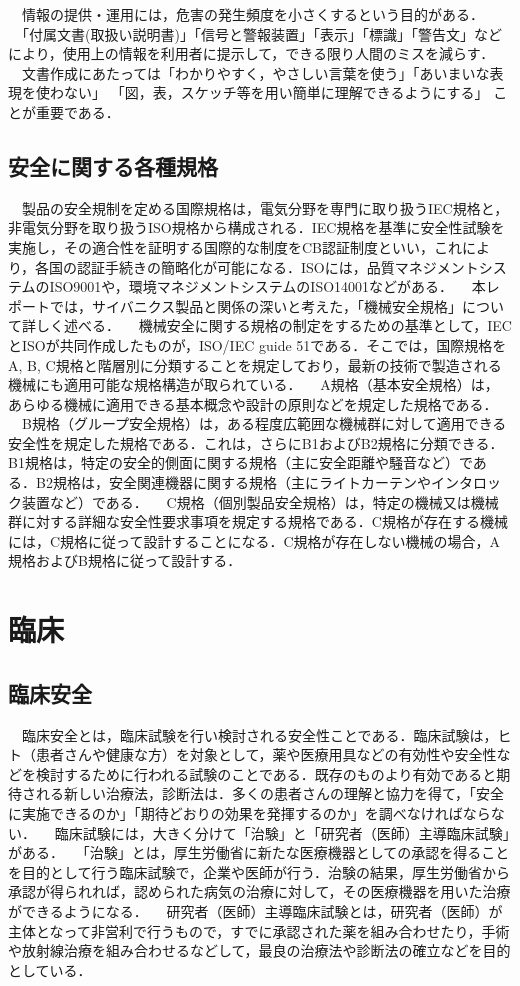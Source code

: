 \documentclass[uplatex,a4paper]{jsarticle}
\begin{document}
　情報の提供・運用には，危害の発生頻度を小さくするという目的がある．
　「付属文書(取扱い説明書)」「信号と警報装置」「表示」「標識」「警告文」などにより，使用上の情報を利用者に提示して，できる限り人間のミスを減らす．
　文書作成にあたっては「わかりやすく，やさしい言葉を使う」「あいまいな表現を使わない」 「図，表，スケッチ等を用い簡単に理解できるようにする」 ことが重要である．
　

\subsection{安全に関する各種規格}
　製品の安全規制を定める国際規格は，電気分野を専門に取り扱うIEC規格と，非電気分野を取り扱うISO規格から構成される．IEC規格を基準に安全性試験を実施し，その適合性を証明する国際的な制度をCB認証制度といい，これにより，各国の認証手続きの簡略化が可能になる．ISOには，品質マネジメントシステムのISO9001や，環境マネジメントシステムのISO14001などがある．
　本レポートでは，サイバニクス製品と関係の深いと考えた，「機械安全規格」について詳しく述べる．
　機械安全に関する規格の制定をするための基準として，IECとISOが共同作成したものが，ISO/IEC guide 51である．そこでは，国際規格をA, B, C規格と階層別に分類することを規定しており，最新の技術で製造される機械にも適用可能な規格構造が取られている．
　A規格（基本安全規格）は，あらゆる機械に適用できる基本概念や設計の原則などを規定した規格である．
　B規格（グループ安全規格）は，ある程度広範囲な機械群に対して適用できる安全性を規定した規格である．これは，さらにB1およびB2規格に分類できる．B1規格は，特定の安全的側面に関する規格（主に安全距離や騒音など）である．B2規格は，安全関連機器に関する規格（主にライトカーテンやインタロック装置など）である．
　C規格（個別製品安全規格）は，特定の機械又は機械群に対する詳細な安全性要求事項を規定する規格である．C規格が存在する機械には，C規格に従って設計することになる．C規格が存在しない機械の場合，A規格およびB規格に従って設計する．


\section{臨床}
\subsection{臨床安全}
　臨床安全とは，臨床試験を行い検討される安全性ことである．臨床試験は，ヒト（患者さんや健康な方）を対象として，薬や医療用具などの有効性や安全性などを検討するために行われる試験のことである．既存のものより有効であると期待される新しい治療法，診断法は．多くの患者さんの理解と協力を得て，「安全に実施できるのか」「期待どおりの効果を発揮するのか」を調べなければならない．
　臨床試験には，大きく分けて「治験」と「研究者（医師）主導臨床試験」がある．
　「治験」とは，厚生労働省に新たな医療機器としての承認を得ることを目的として行う臨床試験で，企業や医師が行う．治験の結果，厚生労働省から承認が得られれば，認められた病気の治療に対して，その医療機器を用いた治療ができるようになる．
　研究者（医師）主導臨床試験とは，研究者（医師）が主体となって非営利で行うもので，すでに承認された薬を組み合わせたり，手術や放射線治療を組み合わせるなどして，最良の治療法や診断法の確立などを目的としている．
\end{document}
